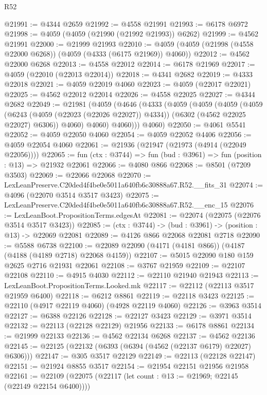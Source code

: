 \begin{lexlean}{R52}
\begin{coremodule}
@21991 := @4344 @2659
@21992 := @4558 @21991
@21993 := @6178 @6972
@21998 := @4059 (@4059 (@21990 (@21992 @21993)) @6262)
@21999 := @4562 @21991
@22000 := @21999 @21993
@22010 := @4059 (@4059 (@21998 (@4558 @22000 @6268)) (@4059 (@4333 (@6175 @21969)) @4060))
@22012 := @4562 @22000 @6268
@22013 := @4558 @22012
@22014 := @6178 @21969
@22017 := @4059 (@22010 (@22013 @22014))
@22018 := @4341 @2682
@22019 := @4333 @22018
@22021 := @4059 @22019 @4060
@22023 := @4059 (@22017 @22021)
@22025 := @4562 @22012 @22014
@22026 := @4558 @22025
@22027 := @4344 @2682
@22049 := @21981
    (@4059
      (@4646
        (@4333
          (@4059
            (@4059
              (@4059
                (@4059
                  (@6243 (@4059 (@22023 (@22026 @22027)) @4334))
                  (@6302 (@4562 @22025 @22027) @6306))
                @4060)
              @4060)
            @4060)))
      @4060)
@22050 := @4061 @5541
@22052 := @4059 @22050 @4060
@22054 := @4059 @22052 @4406
@22056 := @4059 @22054 @4060
@22061 := @21936 (@21947 (@21973 (@4914 (@22049 @22056))))
@22065 := fun (ctx : @3744) => fun (bud : @3961) => fun (position : @13) => @21932 @22061
@22066 := @4080 @866
@22068 := @8501 (@7209 @3503)
@22069 := @22066 @22068
@22070 := LexLeanPreserve.C20ded4f4be0e5011a640fb6c30888a67.R52.__fits_31
@22074 := @4096 (@22070 @3514 @3517 @3423)
@22075 := LexLeanPreserve.C20ded4f4be0e5011a640fb6c30888a67.R52.__enc_15
@22076 := LexLeanBoot.PropositionTerms.edgesAt
@22081 := @22074 (@22075 (@22076 @3514 @3517 @3423))
@22085 := (ctx : @3744) -> (bud : @3961) -> (position : @13) -> @22069 @22081
@22089 := @4126 @866 @22068 @22081 @2718
@22090 := @5588 @6738
@22100 := @22089 @22090 (@4171 (@4181 @866)) (@4187 (@4188 (@4189 @2718) @22068 @4159))
@22107 := @5015 @22090 @180 @159 @2625 @2716 @21931 @22061
@22108 := @3767 @21959
@22109 := @22107 @22108
@22110 := @4915 @4030
@22112 := @22110 @21940 @21943
@22113 := LexLeanBoot.PropositionTerms.Looked.mk
@22117 := @22112 (@22113 @3517 @21959 @6400)
@22118 := @6212 @8861
@22119 := @22118 @3423
@22125 := @22110 (@4917 @22119 @4060) (@4928 @22119 @4060)
@22126 := @3963 @3514
@22127 := @6388 @22126
@22128 := @22127 @3423
@22129 := @3971 @3514
@22132 := @22113 (@22128 @22129) @21956
@22133 := @6178 @8861
@22134 := @21999 @22133
@22136 := @4562 @22134 @6268
@22137 := @4562 @22136
@22145 := @22125 (@22132 (@6393 (@6394 (@4562 (@22137 @6179) @22027) @6306)))
@22147 := @305 @3517 @22129
@22149 := @22113 (@22128 @22147)
@22151 := @21924 @8855 @3517
@22154 := @21954 @22151 @21956 @21958
@22161 := @22109 (@22075 (@22117 (let count : @13 := @21969; @22145 (@22149 @22154 @6400))))

\end{coremodule}
\end{lexlean}
